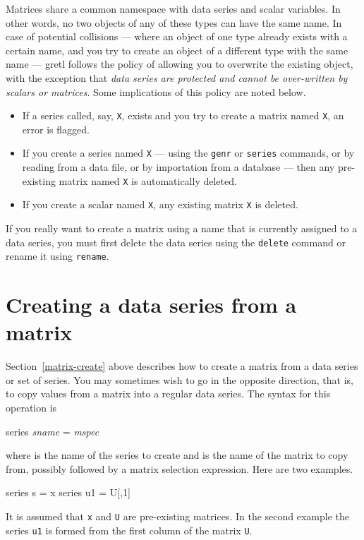 Matrices share a common namespace with data series and scalar
variables.  In other words, no two objects of any of these types can
have the same name.  In case of potential collisions --- where an
object of one type already exists with a certain name, and you try to
create an object of a different type with the same name --- gretl
follows the policy of allowing you to overwrite the existing object, 
with the exception that \textit{data series are protected and cannot be
over-written by scalars or matrices}.  Some implications of this
policy are noted below.
%
\begin{itemize}
\item If a series called, say, \texttt{X}, exists and you try to
  create a matrix named \texttt{X}, an error is flagged.
\item If you create a series named \texttt{X} --- using the
  \texttt{genr} or \texttt{series} commands, or by reading from a data
  file, or by importation from a database --- then any pre-existing
  matrix named \texttt{X} is automatically deleted.
\item If you create a scalar named \texttt{X}, any existing matrix
  \texttt{X} is deleted.
\end{itemize}
%
If you really want to create a matrix using a name that is currently
assigned to a data series, you must first delete the data series using
the \texttt{delete} command or rename it using \texttt{rename}.

\section{Creating a data series from a matrix}
\label{matrix-create-series}

Section~\ref{matrix-create} above describes how to create a matrix
from a data series or set of series.  You may sometimes wish to go in
the opposite direction, that is, to copy values from a matrix 
into a regular data series.  The syntax for this operation is
%
\begin{textcode}
series \textsl{sname} = \textsl{mspec}
\end{textcode}
%
where  is the name of the series to create and
 is the name of the matrix to copy from, possibly followed
by a matrix selection expression.  Here are two examples.
%
\begin{code}
series s = x
series u1 = U[,1]
\end{code}
%
It is assumed that \texttt{x} and \texttt{U} are pre-existing
matrices.  In the second example the series \texttt{u1} is formed from
the first column of the matrix \texttt{U}.

